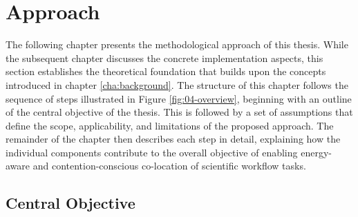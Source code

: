 \section{Approach}
\label{cha:approach}

The following chapter presents the methodological approach of this thesis. While the subsequent chapter discusses the concrete implementation aspects, this section establishes the theoretical foundation that builds upon the concepts introduced in chapter \ref{cha:background}. The structure of this chapter follows the sequence of steps illustrated in Figure \ref{fig:04-overview}, beginning with an outline of the central objective of the thesis. This is followed by a set of assumptions that define the scope, applicability, and limitations of the proposed approach. The remainder of the chapter then describes each step in detail, explaining how the individual components contribute to the overall objective of enabling energy-aware and contention-conscious co-location of scientific workflow tasks.

\subsection{Central Objective}
\label{sec:central_objective}

